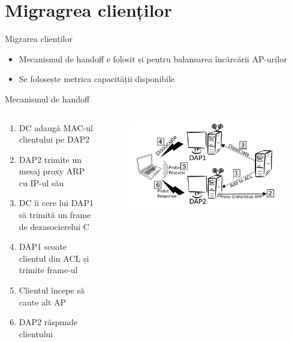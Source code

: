 \section{Migragrea clienților}

\begin{frame}{Migrarea clienților}
  \begin{itemize}
    \item Mecanismul de handoff e folosit și pentru balansarea încărcării AP-urilor
    \item Se folosește metrica capacității disponibile
  \end{itemize}
\end{frame}

\begin{frame}{Mecanismul de handoff}
  \begin{columns}
  \begin{column}{0.5\linewidth}
    \begin{enumerate}
      \item DC adaugă MAC-ul clientului pe DAP2
      \item DAP2 trimite un mesaj proxy ARP cu IP-ul său
      \item DC îi cere lui DAP1 să trimită un frame de dezasocierelui C
      \item DAP1 scoate clientul din ACL și trimite frame-ul
      \item Clientul începe să caute alt AP
      \item DAP2 răspunde clientului
    \end{enumerate}
  \end{column}
  \begin{column}{0.5\linewidth}
    \begin{figure}
      \includegraphics[scale=0.20]{img/fig3.png}
    \end{figure}
  \end{column}
  \end{columns}
\end{frame}

